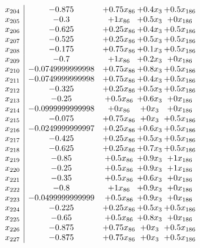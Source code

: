 \documentclass[11pt]{article}
\begin{document}
\[\begin{array}{c| c c@{\hskip 2pt} c@{\hskip 2pt} c@{\hskip 2pt} }
 x_{204}   &  -0.875 & + 0.75 x_{86} & + 0.4 x_{3} & + 0.5 x_{186}\\
 x_{205}   &  -0.3 & + 1 x_{86} & + 0.5 x_{3} & + 0 x_{186}\\
 x_{206}   &  -0.625 & + 0.25 x_{86} & + 0.4 x_{3} & + 0.5 x_{186}\\
 x_{207}   &  -0.525 & + 0.25 x_{86} & + 0.5 x_{3} & + 0.5 x_{186}\\
 x_{208}   &  -0.175 & + 0.75 x_{86} & + 0.1 x_{3} & + 0.5 x_{186}\\
 x_{209}   &  -0.7 & + 1 x_{86} & + 0.2 x_{3} & + 0 x_{186}\\
 x_{210}   &  -0.0749999999998 & + 0.75 x_{86} & + 0.8 x_{3} & + 0.5 x_{186}\\
 x_{211}   &  -0.0749999999998 & + 0.75 x_{86} & + 0.4 x_{3} & + 0.5 x_{186}\\
 x_{212}   &  -0.325 & + 0.25 x_{86} & + 0.5 x_{3} & + 0.5 x_{186}\\
 x_{213}   &  -0.25 & + 0.5 x_{86} & + 0.6 x_{3} & + 0 x_{186}\\
 x_{214}   &  -0.0999999999998 & + 0 x_{86} & + 0 x_{3} & + 0 x_{186}\\
 x_{215}   &  -0.075 & + 0.75 x_{86} & + 0 x_{3} & + 0.5 x_{186}\\
 x_{216}   &  -0.0249999999997 & + 0.25 x_{86} & + 0.6 x_{3} & + 0.5 x_{186}\\
 x_{217}   &  -0.425 & + 0.25 x_{86} & + 0.5 x_{3} & + 0.5 x_{186}\\
 x_{218}   &  -0.625 & + 0.25 x_{86} & + 0.7 x_{3} & + 0.5 x_{186}\\
 x_{219}   &  -0.85 & + 0.5 x_{86} & + 0.9 x_{3} & + 1 x_{186}\\
 x_{220}   &  -0.25 & + 0.5 x_{86} & + 0.9 x_{3} & + 1 x_{186}\\
 x_{221}   &  -0.35 & + 0.5 x_{86} & + 0.6 x_{3} & + 0 x_{186}\\
 x_{222}   &  -0.8 & + 1 x_{86} & + 0.9 x_{3} & + 0 x_{186}\\
 x_{223}   &  -0.0499999999999 & + 0.5 x_{86} & + 0.9 x_{3} & + 0 x_{186}\\
 x_{224}   &  -0.225 & + 0.25 x_{86} & + 0.5 x_{3} & + 0.5 x_{186}\\
 x_{225}   &  -0.65 & + 0.5 x_{86} & + 0.8 x_{3} & + 0 x_{186}\\
 x_{226}   &  -0.875 & + 0.75 x_{86} & + 0 x_{3} & + 0.5 x_{186}\\
 x_{227}   &  -0.875 & + 0.75 x_{86} & + 0 x_{3} & + 0.5 x_{186}\\

\end{array}\]
\end{document}
